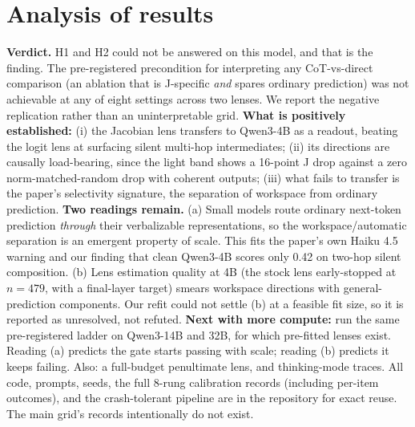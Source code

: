 \documentclass[11pt]{article}
\begin{document}
\section{Analysis of results}
\textbf{Verdict.} H1 and H2 could not be answered on this model, and that is the
finding. The pre-registered precondition for interpreting any CoT-vs-direct comparison
(an ablation that is J-specific \emph{and} spares ordinary prediction) was not
achievable at any of eight settings across two lenses. We report the negative
replication rather than an uninterpretable grid. \textbf{What is positively
established:} (i) the Jacobian lens transfers to Qwen3-4B as a readout, beating the
logit lens at surfacing silent multi-hop intermediates; (ii) its directions are
causally load-bearing, since the light band shows a 16-point J drop against a zero
norm-matched-random drop with coherent outputs; (iii) what fails to transfer is the
paper's selectivity signature, the separation of workspace from ordinary prediction.
\textbf{Two readings remain.} (a) Small models route ordinary next-token prediction
\emph{through} their verbalizable representations, so the workspace/automatic
separation is an emergent property of scale. This fits the paper's own Haiku 4.5
warning and our finding that clean Qwen3-4B scores only 0.42 on two-hop silent
composition. (b) Lens estimation quality at 4B (the stock lens early-stopped at
$n{=}479$, with a final-layer target) smears workspace directions with
general-prediction components. Our refit could not settle (b) at a feasible fit size,
so it is reported as unresolved, not refuted. \textbf{Next with more compute:} run the
same pre-registered ladder on Qwen3-14B and 32B, for which pre-fitted lenses exist.
Reading (a) predicts the gate starts passing with scale; reading (b) predicts it keeps
failing. Also: a full-budget penultimate lens, and thinking-mode traces. All code,
prompts, seeds, the full 8-rung calibration records (including per-item outcomes), and
the crash-tolerant pipeline are in the repository for exact reuse. The main grid's
records intentionally do not exist.
\end{document}
